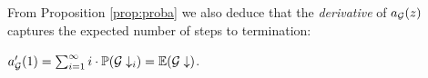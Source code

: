 From Proposition \ref{prop:proba} we also deduce that the \emph{derivative} of $a_{\mathcal{G}}(z)$ captures the expected number of steps to termination:

\begin{corollary}\label{cor:expected}
$a'_{\mathcal{G}}(1)=\sum_{i=1}^{\infty} i\cdot \mathbb P(\mathcal{G}\downarrow_i)=\mathbb E(\mathcal{G}\downarrow)$.

\end{corollary}
%





%

